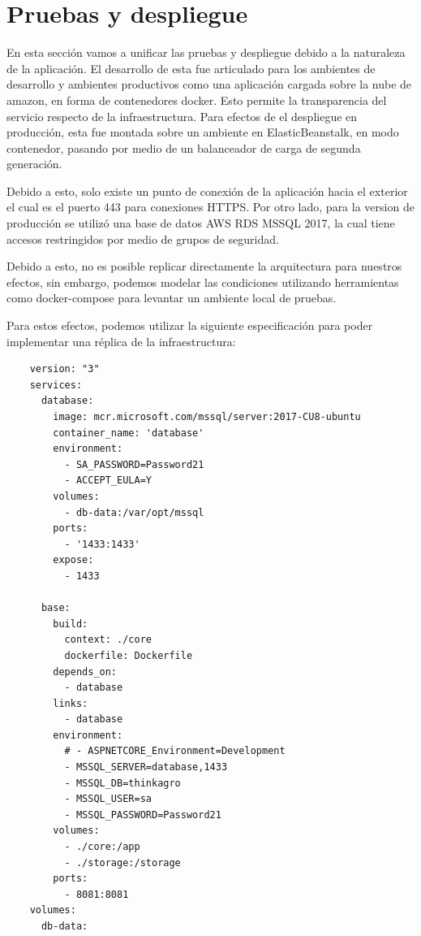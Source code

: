 \section{Pruebas y despliegue}

En esta sección vamos a unificar las pruebas y despliegue debido a la naturaleza de la aplicación. El desarrollo de esta fue articulado para los ambientes de desarrollo y ambientes productivos como una aplicación cargada sobre la nube de amazon, en forma de contenedores docker. Esto permite la transparencia del servicio respecto de la infraestructura. Para efectos de el despliegue en producción, esta fue montada sobre un ambiente en ElasticBeanstalk, en modo contenedor, pasando por medio de un balanceador de carga de segunda generación.

Debido a esto, solo existe un punto de conexión de la aplicación hacia el exterior el cual es el puerto 443 para conexiones HTTPS. Por otro lado, para la version de producción se utilizó una base de datos AWS RDS MSSQL 2017, la cual tiene accesos restringidos por medio de grupos de seguridad.

Debido a esto, no es posible replicar directamente la arquitectura para nuestros efectos, sin embargo, podemos modelar las condiciones utilizando herramientas como docker-compose para levantar un ambiente local de pruebas.

Para estos efectos, podemos utilizar la siguiente especificación para poder implementar una réplica de la infraestructura:

\begin{verbatim}
    version: "3"
    services:
      database:
        image: mcr.microsoft.com/mssql/server:2017-CU8-ubuntu
        container_name: 'database'
        environment:
          - SA_PASSWORD=Password21
          - ACCEPT_EULA=Y
        volumes: 
          - db-data:/var/opt/mssql
        ports:
          - '1433:1433'
        expose:
          - 1433
      
      base: 
        build:
          context: ./core
          dockerfile: Dockerfile
        depends_on: 
          - database
        links:
          - database
        environment:      
          # - ASPNETCORE_Environment=Development
          - MSSQL_SERVER=database,1433
          - MSSQL_DB=thinkagro
          - MSSQL_USER=sa
          - MSSQL_PASSWORD=Password21
        volumes:
          - ./core:/app
          - ./storage:/storage
        ports: 
          - 8081:8081
    volumes:
      db-data:
\end{verbatim}

